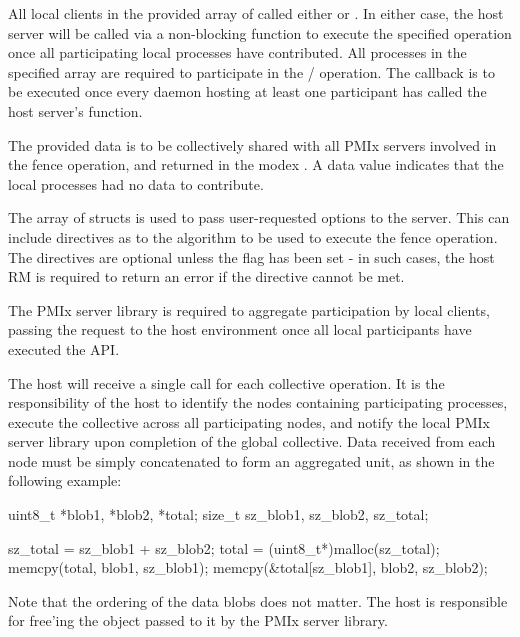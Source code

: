 \descr

All local clients in the provided array of  called either  or .
In either case, the host server will be called via a non-blocking function to execute the specified operation once all participating local processes have contributed.
All processes in the specified  array are required to participate in the / operation.
The callback is to be executed once every daemon hosting at least one participant has called the host server's  function.

The provided data is to be collectively shared with all \ac{PMIx} servers involved in the fence operation, and returned in the modex .
A  data value indicates that the local processes had no data to contribute.

The array of  structs is used to pass user-requested options to the server.
This can include directives as to the algorithm to be used to execute the fence operation.
The directives are optional unless the  flag has been set - in such cases, the host \ac{RM} is required to return an error if the directive cannot be met.

\adviceimplstart
The \ac{PMIx} server library is required to aggregate participation by local clients, passing the request to the host environment once all local participants have executed the \ac{API}.
\adviceimplend

\advicermstart
The host will receive a single call for each collective operation. It is the responsibility of the host to identify the nodes containing participating processes, execute the collective across all participating nodes, and notify the local \ac{PMIx} server library upon completion of the global collective. Data received from each node must be simply concatenated to form an aggregated unit, as shown in the following example:

\cspecificstart
\begin{codepar}
uint8_t *blob1, *blob2, *total;
size_t sz_blob1, sz_blob2, sz_total;

sz_total = sz_blob1 + sz_blob2;
total = (uint8_t*)malloc(sz_total);
memcpy(total, blob1, sz_blob1);
memcpy(\&total[sz_blob1], blob2, sz_blob2);
\end{codepar}
\cspecificend

Note that the ordering of the data blobs does not matter. The host is responsible for free'ing the  object passed to it by the \ac{PMIx} server library.
\advicermend


